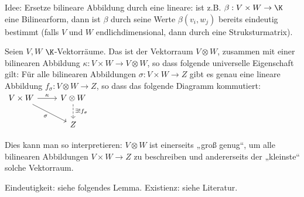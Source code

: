 

Idee: Ersetze bilineare Abbildung durch eine lineare: ist z.B. $\beta: V \times W \to \K$ eine Bilinearform, dann ist $\beta$ durch seine Werte $\beta(v_i, w_j)$ bereits eindeutig bestimmt (falls $V$ und $W$ endlichdimensional, dann durch eine Struksturmatrix).

\begin{df} \label{5.10}
    Seien $V, W$ $\K$-Vektorräume.
    Das  ist der Vektorraum $V \otimes W$, zusammen mit einer bilinearen Abbildung $\kappa: V \times W \to V \otimes W$, so dass folgende universelle Eigenschaft gilt:
    Für alle bilinearen Abbildungen $\sigma: V \times W \to Z$ gibt es genau eine lineare Abbildung $f_\sigma: V \otimes W \to Z$, so dass das folgende Diagramm kommutiert:
    \begin{math}
        \begin{tikzcd}
            V \times W \ar[r,"\kappa"] \ar[rd,"\sigma"'] & V \otimes W \ar[d,"\exists! f_\sigma",dashed] \\
            & Z
        \end{tikzcd}
    \end{math}
    \begin{note}
        Dies kann man so interpretieren: $V \otimes W$ ist einerseits „groß genug“, um alle bilinearen Abbildungen $V \times W \to Z$ zu beschreiben und andererseits der „kleinste“ solche Vektorraum.

        Eindeutigkeit: siehe folgendes Lemma.
        Existienz: siehe Literatur.
    \end{note}
\end{df}

